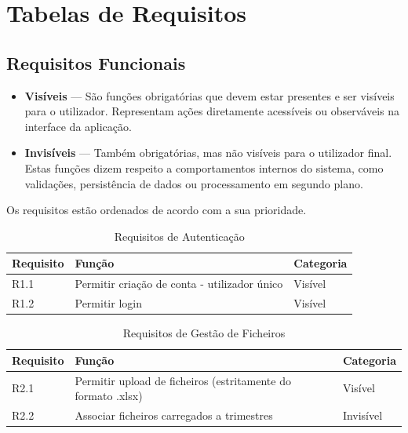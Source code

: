 \chapter{Tabelas de Requisitos}
\label{ch:tabRequisitos}

\section{Requisitos Funcionais}

\begin{itemize}
\item \textbf{Visíveis} — São funções obrigatórias que devem estar presentes e ser visíveis para o utilizador. Representam ações diretamente acessíveis ou observáveis na interface da aplicação.

\item \textbf{Invisíveis} — Também obrigatórias, mas não visíveis para o utilizador final. Estas funções dizem respeito a comportamentos internos do sistema, como validações, persistência de dados ou processamento em segundo plano.
\end{itemize}

Os requisitos estão ordenados de acordo com a sua prioridade.

\begin{table}[h!]
\centering
\begin{tabular}{|l|p{7cm}|l|}
\hline
\textbf{Requisito} & \textbf{Função} & \textbf{Categoria} \\
\hline
R1.1 & Permitir criação de conta - utilizador único & Visível \\
R1.2 & Permitir login & Visível \\
\hline
\end{tabular}
\caption{Requisitos de Autenticação}
\label{tab:requisitosAutenticacao}
\end{table}

\begin{table}[h!]
\centering
\begin{tabular}{|l|p{7cm}|l|}
\hline
\textbf{Requisito} & \textbf{Função} & \textbf{Categoria} \\
\hline
R2.1 & Permitir upload de ficheiros (estritamente do formato .xlsx) & Visível \\
R2.2 & Associar ficheiros carregados a trimestres & Invisível \\
\hline
\end{tabular}
\caption{Requisitos de Gestão de Ficheiros}
\label{tab:requisitosFicheiros}
\end{table}

